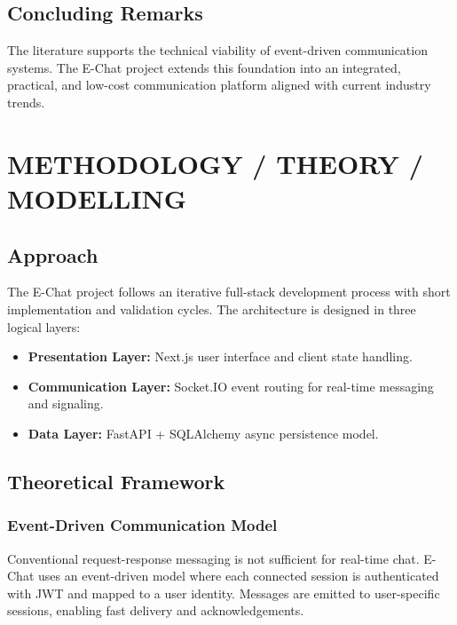 \documentclass[12pt,a4paper,oneside]{report}
\begin{document}
\section{Concluding Remarks}
\label{sec:literature-conclusion}

The literature supports the technical viability of event-driven communication
systems. The E-Chat project extends this foundation into an integrated, practical,
and low-cost communication platform aligned with current industry trends.

\cleardoublepage

\chapter{METHODOLOGY / THEORY / MODELLING}
\label{chap:methodology}
\thispagestyle{plain}

\section{Approach}
\label{sec:approach}

The E-Chat project follows an iterative full-stack development process with
short implementation and validation cycles. The architecture is designed in
three logical layers:
\begin{itemize}
  \item \textbf{Presentation Layer:} Next.js user interface and client state handling.
  \item \textbf{Communication Layer:} Socket.IO event routing for real-time messaging and signaling.
  \item \textbf{Data Layer:} FastAPI + SQLAlchemy async persistence model.
\end{itemize}

\section{Theoretical Framework}
\label{sec:theoretical-framework}

\subsection{Event-Driven Communication Model}
\label{subsec:event-driven-model}
Conventional request-response messaging is not sufficient for real-time chat.
E-Chat uses an event-driven model where each connected session is authenticated
with JWT and mapped to a user identity. Messages are emitted to user-specific
sessions, enabling fast delivery and acknowledgements.
\end{document}
